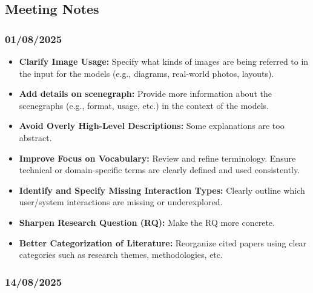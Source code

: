 \documentclass{article}
\begin{document}
\subsection{Meeting Notes}

\subsubsection{01/08/2025}    

\begin{itemize}
    \item \textbf{Clarify Image Usage:} Specify what kinds of images are being referred to in the input for the models (e.g., diagrams, real-world photos, layouts).
    
    \item \textbf{Add details on scenegraph:} Provide more information about the scenegraphs (e.g., format, usage, etc.) in the context of the models.
    
    \item \textbf{Avoid Overly High-Level Descriptions:} Some explanations are too abstract.
    
    \item \textbf{Improve Focus on Vocabulary:} Review and refine terminology. Ensure technical or domain-specific terms are clearly defined and used consistently.
    
    \item \textbf{Identify and Specify Missing Interaction Types:} Clearly outline which user/system interactions are missing or underexplored.
    
    \item \textbf{Sharpen Research Question (RQ):} Make the RQ more concrete.
    
    \item \textbf{Better Categorization of Literature:} Reorganize cited papers using clear categories such as research themes, methodologies, etc.
\end{itemize}

\subsubsection{14/08/2025}    
\end{document}
